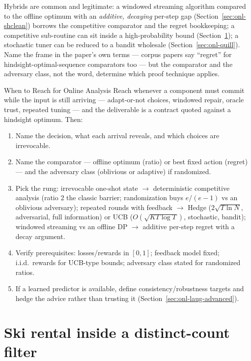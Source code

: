 Hybrids are common and legitimate: a windowed streaming algorithm compared to the
offline optimum with an \emph{additive, decaying} per-step gap
(Section~\ref{sec:onl-shclean}) borrows the competitive comparator and the regret
bookkeeping; a competitive sub-routine can sit inside a high-probability bound
(Section~\ref{sec:onl-ski}); a stochastic tuner can be reduced to a bandit wholesale
(Section~\ref{sec:onl-quill}). Name the frame in the paper's own terms --- corpus papers
say ``regret'' for hindsight-optimal-sequence comparators too --- but the comparator and
the adversary class, not the word, determine which proof technique applies.

\begin{reachbox}{When to Reach for Online Analysis}
Reach whenever a component must commit while the input is still arriving ---
adapt-or-not choices, windowed repair, oracle trust, repeated tuning --- and the
deliverable is a contract quoted against a hindsight optimum. Then:
\begin{enumerate}
\item Name the decision, what each arrival reveals, and which choices are irrevocable.
\item Name the comparator --- offline optimum (ratio) or best fixed action (regret) ---
  and the adversary class (oblivious or adaptive) if randomized.
\item Pick the rung: irrevocable one-shot state $\to$ deterministic competitive analysis
  (ratio $2$ the classic barrier; randomization buys $e/(e-1)$ vs an oblivious
  adversary); repeated rounds with feedback $\to$ Hedge ($2\sqrt{T\ln N}$, adversarial,
  full information) or UCB ($O(\sqrt{KT\log T})$, stochastic, bandit); windowed
  streaming vs an offline DP $\to$ additive per-step regret with a decay argument.
\item Verify prerequisites: losses/rewards in $[0,1]$; feedback model fixed; i.i.d.\
  rewards for UCB-type bounds; adversary class stated for randomized ratios.
\item If a learned predictor is available, define consistency/robustness targets and
  hedge the advice rather than trusting it (Section~\ref{sec:onl-laug-advanced}).
\end{enumerate}
\end{reachbox}

\section{Ski rental inside a distinct-count filter}
\label{sec:onl-ski}


